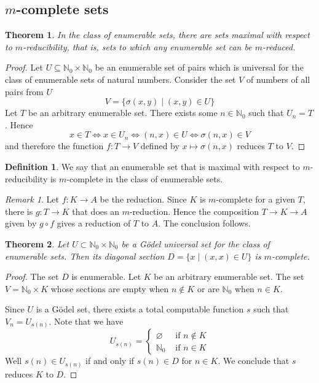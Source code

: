 \documentclass[10pt, letterpaper]{article}
\newcommand{\N}{\mathbb{N}}
\newtheorem{thm}{Theorem}
\theoremstyle{remark}
\newtheorem{rem}{Remark}
\theoremstyle{definition}
\newtheorem{defn}{Definition}
\begin{document}
    \subsection*{$m$-complete sets}

    \begin{thm}
        In the class of enumerable sets, there are sets maximal with respect to $m$-reducibility, that is, sets to which any 
        enumerable set can be $m$-reduced.
    \end{thm}

    \begin{proof}
        Let $U \subseteq \N_0 \times \N_0$ be an enumerable set of pairs which is universal for the class of enumerable sets of 
        natural numbers. Consider the set $V$ of numbers of all pairs from $U$
        \[
            V =  \{\sigma(x,y) \mid (x,y) \in U \}
        \]
        Let $T$ be an arbitrary enumerable set. There exists some $n \in \N_0$ such that $U_n = T$. Hence
        \[
            x \in T \Leftrightarrow x \in U_n \Leftrightarrow (n,x) \in U \Leftrightarrow \sigma(n,x) \in V
        \]
        and therefore the function $f: T \rightarrow V$ defined by $x \mapsto \sigma(n,x)$ reduces $T$ to $V$.
    \end{proof}

    \begin{defn}
        We say that an enumerable set that is maximal with respect to $m$-reducibility is $m$-complete in the class of enumerable sets.
    \end{defn}

    \begin{rem}
        Let $f:K \rightarrow A$ be the reduction. Since $K$ is $m$-complete for a given $T$, there is $g:T \rightarrow K$ that does 
        an $m$-reduction. Hence the composition $T \rightarrow K \rightarrow A$ given by $g \circ f$ gives a reduction of $T$ to $A$.
        The conclusion follows.
    \end{rem}

    \begin{thm}
        Let $U \subset \N_0 \times \N_0$ be a G\"{o}del universal set for the class of enumerable sets. Then its diagonal section 
        $D = \{x \mid (x,x) \in U\}$  is $m$-complete.
    \end{thm}

    \begin{proof}
        The set $D$ is enumerable. Let $K$ be an arbitrary enumerable set. The set $V = \N_0 \times K$ whose sections are empty when 
        $n \notin K$ or are $\N_0$ when $n \in K$.

        Since $U$ is a G\"{o}del set, there exists a total computable function $s$ such that $V_n = U_{s(n)}$. Note that we have 
        \[
            U_{s(n)} = \begin{cases}
                \varnothing &\text{ if } n \notin K \\
                \N_0 &\text{ if } n \in K
            \end{cases}
        \]
        Well $s(n) \in U_{s(n)}$ if and only if $s(n) \in D$ for $n \in K$. We conclude that $s$ reduces $K$ to $D$.
    \end{proof}
\end{document}
